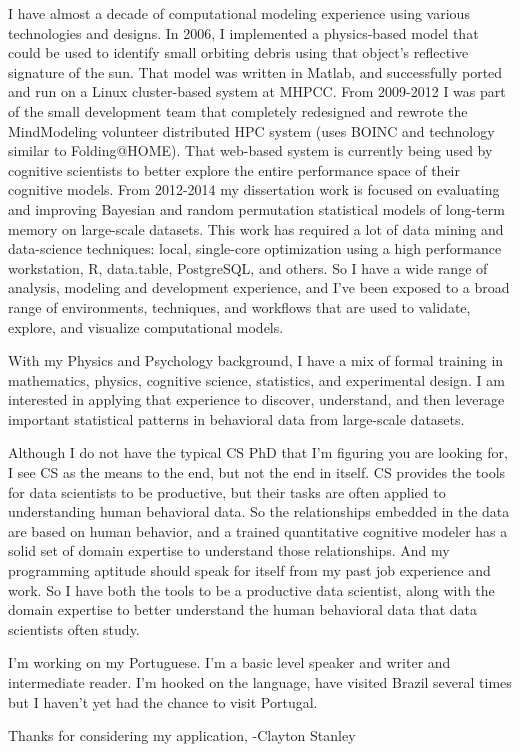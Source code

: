 \documentclass{article}
\begin{document}
I have almost a decade of computational modeling experience using various technologies and designs.
In 2006, I implemented a physics-based model that could be used to identify small orbiting debris using that object's reflective signature of the sun.
That model was written in Matlab, and successfully ported and run on a Linux cluster-based system at MHPCC.
From 2009-2012 I was part of the small development team that completely redesigned and rewrote the MindModeling volunteer distributed HPC system (uses BOINC and technology similar to Folding@HOME).
That web-based system is currently being used by cognitive scientists to better explore the entire performance space of their cognitive models.
From 2012-2014 my dissertation work is focused on evaluating and improving Bayesian and random permutation statistical models of long-term memory on large-scale datasets.
This work has required a lot of data mining and data-science techniques: local, single-core optimization using a high performance workstation, R, data.table, PostgreSQL, and others.
So I have a wide range of analysis, modeling and development experience, and I've been exposed to a broad range of environments, techniques, and workflows that are used to validate, explore, and visualize computational models.

With my Physics and Psychology background, I have a mix of formal training in mathematics, physics, cognitive science, statistics, and experimental design.
I am interested in applying that experience to discover, understand, and then leverage important statistical patterns in behavioral data from large-scale datasets.

Although I do not have the typical CS PhD that I'm figuring you are looking for, I see CS as the means to the end, but not the end in itself.
CS provides the tools for data scientists to be productive, but their tasks are often applied to understanding human behavioral data.
So the relationships embedded in the data are based on human behavior, and a trained quantitative cognitive modeler has a solid set of domain expertise to understand those relationships.
And my programming aptitude should speak for itself from my past job experience and work.
So I have both the tools to be a productive data scientist, along with the domain expertise to better understand the human behavioral data that data scientists often study.

I'm working on my Portuguese.
I'm a basic level speaker and writer and intermediate reader.
I'm hooked on the language, have visited Brazil several times but I haven't yet had the chance to visit Portugal.

Thanks for considering my application,
-Clayton Stanley
\end{document}
